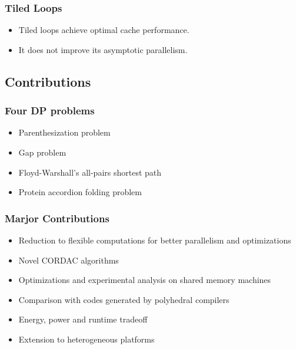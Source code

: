 \begin{frame}
    \frametitle{Tiled Loops}
	\begin{itemize}
		\item Tiled loops achieve optimal cache performance.
		\item It does not improve its asymptotic parallelism.
	\end{itemize}
\end{frame}

\subsection{Contributions}
\begin{frame}
    \frametitle{Four DP problems}
	\begin{itemize}
		\item Parenthesization problem
		\item Gap problem
		\item Floyd-Warshall's all-pairs shortest path
		\item Protein accordion folding problem
	\end{itemize}
\end{frame}

\begin{frame}
    \frametitle{Marjor Contributions}
	\begin{itemize}
		\item Reduction to flexible computations for better parallelism
			and optimizations
		\item Novel CORDAC algorithms
		\item Optimizations and experimental analysis on shared memory machines
		\item Comparison with codes generated by polyhedral compilers
		\item Energy, power and runtime tradeoff
		\item Extension to heterogeneous platforms
	\end{itemize}
\end{frame}
